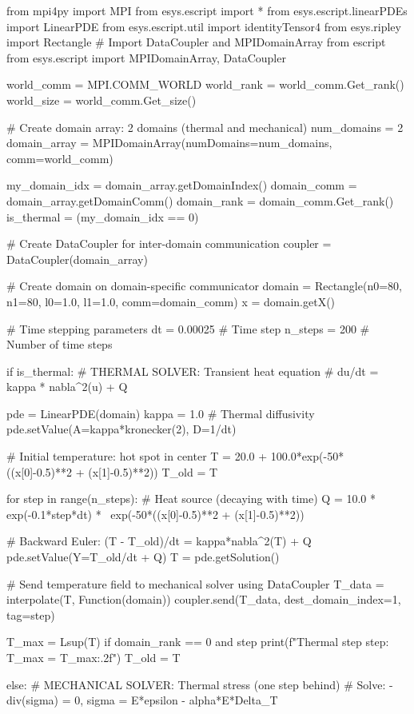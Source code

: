 \begin{python}
from mpi4py import MPI
from esys.escript import *
from esys.escript.linearPDEs import LinearPDE
from esys.escript.util import identityTensor4
from esys.ripley import Rectangle
# Import DataCoupler and MPIDomainArray from escript
from esys.escript import MPIDomainArray, DataCoupler

world_comm = MPI.COMM_WORLD
world_rank = world_comm.Get_rank()
world_size = world_comm.Get_size()

# Create domain array: 2 domains (thermal and mechanical)
num_domains = 2
domain_array = MPIDomainArray(numDomains=num_domains, comm=world_comm)

my_domain_idx = domain_array.getDomainIndex()
domain_comm = domain_array.getDomainComm()
domain_rank = domain_comm.Get_rank()
is_thermal = (my_domain_idx == 0)

# Create DataCoupler for inter-domain communication
coupler = DataCoupler(domain_array)

# Create domain on domain-specific communicator
domain = Rectangle(n0=80, n1=80, l0=1.0, l1=1.0, comm=domain_comm)
x = domain.getX()

# Time stepping parameters
dt = 0.00025   # Time step
n_steps = 200  # Number of time steps

if is_thermal:
    # THERMAL SOLVER: Transient heat equation
    # du/dt = kappa * nabla^2(u) + Q

    pde = LinearPDE(domain)
    kappa = 1.0  # Thermal diffusivity
    pde.setValue(A=kappa*kronecker(2), D=1/dt)

    # Initial temperature: hot spot in center
    T = 20.0 + 100.0*exp(-50*((x[0]-0.5)**2 + (x[1]-0.5)**2))
    T_old = T

    for step in range(n_steps):
        # Heat source (decaying with time)
        Q = 10.0 * exp(-0.1*step*dt) * \
            exp(-50*((x[0]-0.5)**2 + (x[1]-0.5)**2))

        # Backward Euler: (T - T_old)/dt = kappa*nabla^2(T) + Q
        pde.setValue(Y=T_old/dt + Q)
        T = pde.getSolution()

        # Send temperature field to mechanical solver using DataCoupler
        T_data = interpolate(T, Function(domain))
        coupler.send(T_data, dest_domain_index=1, tag=step)

        T_max = Lsup(T)
        if domain_rank == 0 and step %
            print(f"Thermal step {step}: T_max = {T_max:.2f}")
        T_old = T

else:
    # MECHANICAL SOLVER: Thermal stress (one step behind)
    # Solve: -div(sigma) = 0, sigma = E*epsilon - alpha*E*Delta_T


\end{python}
